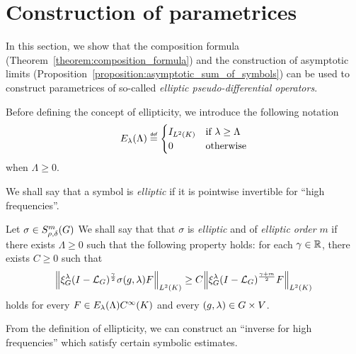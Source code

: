 \section{Construction of parametrices}

In this section,
we show that the composition formula (Theorem~\ref{theorem:composition_formula})
and the construction of asymptotic limits (Proposition~\ref{proposition:asymptotic_sum_of_symbols})
can be used to construct parametrices of so-called \emph{elliptic pseudo-differential operators}.

Before defining the concept of ellipticity,
we introduce the following notation
\begin{align*}
    E_\lambda(\Lambda)
    \defeq
    \begin{cases}
        \Id {\Lebesgue 2 \CompactGroup} & \text{if } \lambda \geq \Lambda\\
        0 & \text{otherwise}
    \end{cases}
\end{align*}
when $\Lambda \geq 0$.

We shall say that a symbol is \emph{elliptic} if it is pointwise invertible for ``high frequencies''.

\begin{definition}[Ellipticity]
\label{definition:ellipticity}
    Let $\sigma \in S^{m}_{\rho, \delta}(G)$
    We shall say that that $\sigma$ is \emph{elliptic} and of \emph{elliptic order} $m$
    if there exists $\Lambda \geq 0$ such that the following property holds:
    for each $\gamma \in \mathbb{R}$,
    there exists $C \geq 0$ such that
    \begin{align}
        \norm [\Lebesgue 2 \CompactGroup] {\Rep \lambda \BesselPotential \gamma \sigma(g, \lambda) F}
        \geq C
        \norm [\Lebesgue 2 \CompactGroup] {\Rep \lambda \BesselPotential {\gamma + m} F}
        \label{eq:definition_of_ellipticity}
    \end{align}
    holds for every $F \in E_\lambda(\Lambda) {C^\infty(K)}$
    and every $(g, \lambda) \in G \times V$.
\end{definition}

From the definition of ellipticity,
we can construct an ``inverse for high frequencies'' which satisfy certain symbolic estimates.

